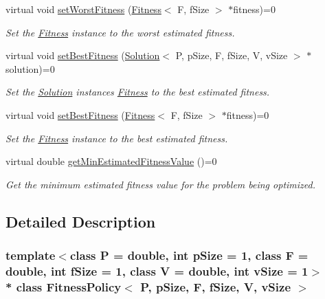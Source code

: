 \begin{DoxyCompactItemize}
virtual void \hyperlink{classFitnessPolicy_a3020ac22527975e1bb8b501cabd2c022}{set\+Worst\+Fitness} (\hyperlink{structFitness}{Fitness}$<$ F, f\+Size $>$ $\ast$fitness)=0
\begin{DoxyCompactList}\small\item\em Set the \hyperlink{structFitness}{Fitness} instance to the worst estimated fitness. \end{DoxyCompactList}\item 
virtual void \hyperlink{classFitnessPolicy_aeb26c6138c90f743bdbe35e079589823}{set\+Best\+Fitness} (\hyperlink{classSolution}{Solution}$<$ P, p\+Size, F, f\+Size, V, v\+Size $>$ $\ast$solution)=0
\begin{DoxyCompactList}\small\item\em Set the \hyperlink{classSolution}{Solution} instance\textquotesingle{}s \hyperlink{structFitness}{Fitness} to the best estimated fitness. \end{DoxyCompactList}\item 
virtual void \hyperlink{classFitnessPolicy_acfa533062de747e373c7c818a70aa040}{set\+Best\+Fitness} (\hyperlink{structFitness}{Fitness}$<$ F, f\+Size $>$ $\ast$fitness)=0
\begin{DoxyCompactList}\small\item\em Set the \hyperlink{structFitness}{Fitness} instance to the best estimated fitness. \end{DoxyCompactList}\item 
virtual double \hyperlink{classFitnessPolicy_a338ed3315f4a4c5c41434ca6266efd3b}{get\+Min\+Estimated\+Fitness\+Value} ()=0
\begin{DoxyCompactList}\small\item\em Get the minimum estimated fitness value for the problem being optimized. \end{DoxyCompactList}\end{DoxyCompactItemize}


\subsection{Detailed Description}
\subsubsection*{template$<$class P = double, int p\+Size = 1, class F = double, int f\+Size = 1, class V = double, int v\+Size = 1$>$\\*
class Fitness\+Policy$<$ P, p\+Size, F, f\+Size, V, v\+Size $>$}

